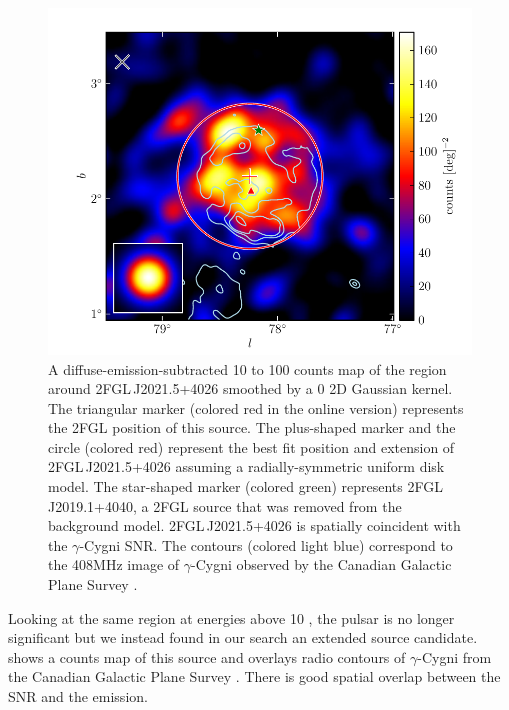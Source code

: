 \begin{figure}[htbp]
  \includegraphics{source_plots/source_Gamma_Cygni_color.pdf}
  \caption{A diffuse-emission-subtracted 10 \gev to 100 \gev counts
  map of the region around 2FGL\,J2021.5+4026 smoothed by a 0
  2D Gaussian kernel. The triangular marker (colored red in the
  online version) represents the 2FGL position of this source.
  The plus-shaped marker and the circle (colored red) represent the
  best fit position and extension of 2FGL\,J2021.5+4026 assuming
  a radially-symmetric uniform disk model.  The star-shaped marker
  (colored green) represents 2FGL\,J2019.1+4040, a 2FGL source that was
  removed from the background model.  2FGL\,J2021.5+4026 is spatially
  coincident with the $\gamma$-Cygni SNR.  The contours (colored light
  blue) correspond to the 408MHz image of $\gamma$-Cygni observed by the
  Canadian Galactic Plane Survey \citep{taylor_2003a_canadian-galactic}.}
\end{figure}

Looking at the same region at energies above 10 \gev, the pulsar is
no longer significant but we instead found in our search an extended
source candidate.   shows a counts map of this
source and overlays radio contours of $\gamma$-Cygni from the Canadian
Galactic Plane Survey \citep{taylor_2003a_canadian-galactic}.  There is
good spatial overlap between the SNR and the \gev emission.

